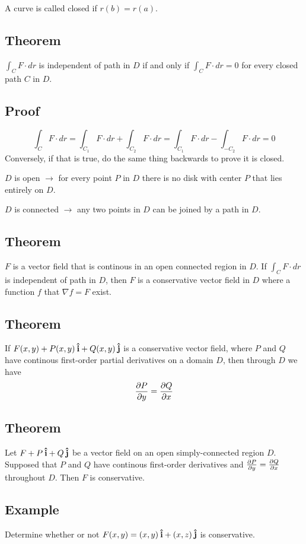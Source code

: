 A curve is called closed if $r(b)=r(a)$.

\subsection*{Theorem}
$\int_C F\cdot dr$ is independent of path in $D$ if and only if $\int_C F\cdot dr=0$
for every closed path $C$ in $D$.

\subsection*{Proof}
$$\int_C F\cdot dr=\int_{C_1} F\cdot dr+\int_{C_2} F\cdot dr=\int_{C_1} F\cdot dr-\int_{-C_2} F\cdot dr=0$$
Conversely, if that is true, do the same thing backwards to prove it is closed.

$D$ is open $\to$ for every point $P$ in $D$ there is no disk with center $P$ that
lies entirely on $D$.

$D$ is connected $\to$ any two points in $D$ can be joined by a path in $D$.

\subsection*{Theorem}
$F$ is a vector field that is continous in an open connected region in $D$. If
$\int_C F\cdot dr$ is independent of path in $D$, then $F$ is a conservative vector
field in $D$ where a function $f$ that $\nabla f=F$ exist.

\subsection*{Theorem}
If $F(x,y)+P(x,y)\:\boldsymbol{\hat{\textbf{i}}}+Q(x,y)\:\boldsymbol{\hat{\textbf{j}}}$ is a conservative vector field, where $P$ and $Q$
have continous first-order partial derivatives on a domain $D$, then through $D$ we have
$$\pdv{P}{y}=\pdv{Q}{x}$$

\subsection*{Theorem}
Let $F+P\:\boldsymbol{\hat{\textbf{i}}} + Q\:\boldsymbol{\hat{\textbf{j}}}$ be a vector field on an open simply-connected region $D$.
Supposed that $P$ and $Q$ have continous first-order derivatives and
$\pdv{P}{y}=\pdv{Q}{x}$ throughout $D$. Then $F$ is conservative.

\subsection*{Example}
Determine whether or not $F(x,y)=(x,y)\:\boldsymbol{\hat{\textbf{i}}}+(x,z)\:\boldsymbol{\hat{\textbf{j}}}$ is conservative.

